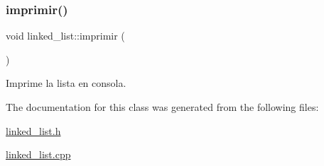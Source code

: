 \subsubsection{\texorpdfstring{imprimir()}{imprimir()}}
{\footnotesize\ttfamily void linked\+\_\+list\+::imprimir (\begin{DoxyParamCaption}{ }\end{DoxyParamCaption})}



Imprime la lista en consola. 



The documentation for this class was generated from the following files\+:\begin{DoxyCompactItemize}
\item 
\hyperlink{linked__list_8h}{linked\+\_\+list.\+h}\item 
\hyperlink{linked__list_8cpp}{linked\+\_\+list.\+cpp}\end{DoxyCompactItemize}
